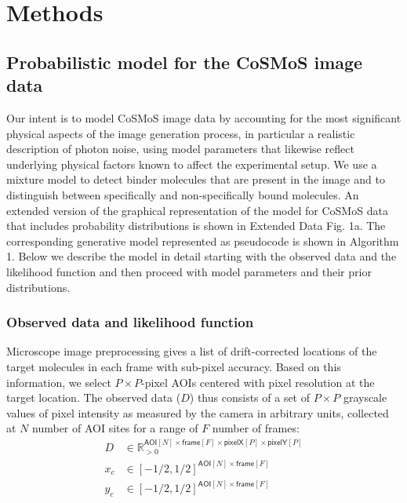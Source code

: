 \section*{Methods}

\subsection*{Probabilistic model for the CoSMoS image data} 

Our intent is to model CoSMoS image data by accounting for the most significant physical aspects of the image generation process, in particular a realistic description of photon noise, using model parameters that likewise reflect underlying physical factors known to affect the experimental setup. We use a mixture model to detect binder molecules that are present in the image and to distinguish between specifically and non-specifically bound molecules. An extended version of the graphical representation of the model for CoSMoS data that includes probability distributions is shown in Extended Data Fig. 1a. The corresponding generative model represented as pseudocode is shown in Algorithm 1. Below we describe the model in detail starting with the observed data and the likelihood function and then proceed with model parameters and their prior distributions.

\subsubsection*{Observed data and likelihood function}

Microscope image preprocessing gives a list of drift-corrected locations of the target molecules in each frame with sub-pixel accuracy. Based on this information, we select $P \times P$-pixel AOIs centered with pixel resolution at the target location. The observed data ($D$) thus consists of a set of $P \times P$ grayscale values of pixel intensity as measured by the camera in arbitrary units, collected at $N$ number of AOI sites for a range of $F$ number of frames:
%
\begin{subequations}
\begin{align}
    D &\in \mathbb{R}_{>0}^{\mathsf{AOI}[N] \times \mathsf{frame}[F] \times \mathsf{pixelX}[P] \times \mathsf{pixelY}[P]} \\
    x_c &\in [-1/2, 1/2]^{\mathsf{AOI}[N] \times \mathsf{frame}[F]} \\
    y_c &\in [-1/2, 1/2]^{\mathsf{AOI}[N] \times \mathsf{frame}[F]}
\end{align}
\end{subequations}

